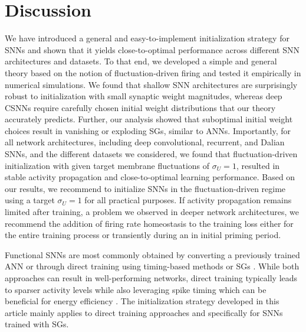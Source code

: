 \documentclass[11pt,a4paper]{article}
\begin{document}
\section*{Discussion}



We have introduced a general and easy-to-implement initialization strategy for \acp{SNN} and shown that it yields close-to-optimal performance across different \ac{SNN} architectures and datasets. 
To that end, we developed a simple and general theory based on the notion of fluctuation-driven firing and tested it empirically in numerical simulations.
We found that shallow \ac{SNN} architectures are surprisingly robust to initialization with small synaptic weight magnitudes, whereas deep \acp{CSNN} require carefully chosen initial weight distributions that our theory accurately predicts. 
Further, our analysis showed that suboptimal initial weight choices result in vanishing or exploding \acp{SG}, similar to \acp{ANN}.
Importantly, for all network architectures, including deep convolutional, recurrent, and Dalian \acp{SNN}, and the different datasets we considered, we found that fluctuation-driven initialization with given target membrane fluctuations of $\sigma_U=1$, resulted in stable activity propagation and close-to-optimal learning performance. 
Based on our results, we recommend to initialize \acp{SNN} in the fluctuation-driven regime using a target $\sigma_U=1$ for all practical purposes.
If activity propagation remains limited after training, a problem we observed in deeper network architectures, we recommend the addition of firing rate homeostasis to the training loss either for the entire training process or transiently during an in initial priming period.

\medskip

Functional \acp{SNN} are most commonly obtained by converting a previously trained ANN \citep{Esser2015-mi,Hunsberger2016-em,Cao2015-yt,OConnor2013-uo,Bu2022-ab} or through direct training using timing-based methods \citep{Bohte2002,booij_gradient_2005, Mostafa2018,Kheradpisheh2020, Comsa2020} or \acp{SG} \citep{Zenke2018-id,Zenke2021-zg,Neftci2019-ie}. 
While both approaches can result in well-performing networks, direct training typically leads to sparser activity levels while also leveraging spike timing which can be beneficial for energy efficiency \citep{davidson_comparison_2021}. 
The initialization strategy developed in this article mainly applies to direct training approaches and specifically for \acp{SNN} trained with \acp{SG}. 
\end{document}
